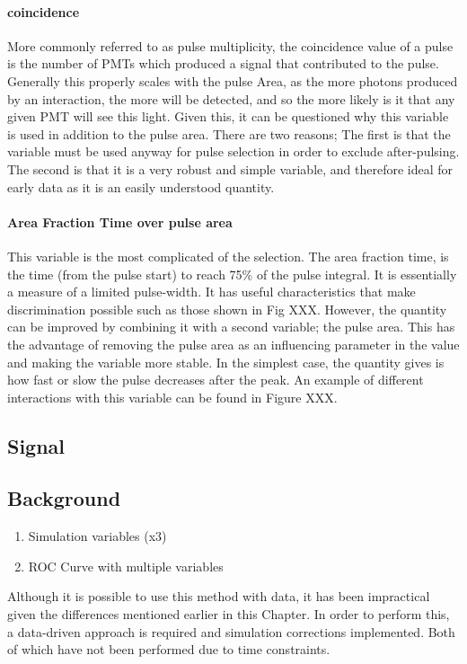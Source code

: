 \paragraph{coincidence}
More commonly referred to as pulse multiplicity, the coincidence value of a pulse is the number of PMTs which produced a signal that contributed to the pulse.
Generally this properly scales with the pulse Area, as the more photons produced by an interaction, the more will be detected, and so the more likely is it that any given PMT will see this light.
Given this, it can be questioned why this variable is used in addition to the pulse area. 
There are two reasons;
The first is that the variable must be used anyway for pulse selection in order to exclude after-pulsing.
The second is that it is a very robust and simple variable, and therefore ideal for early data as it is an easily understood quantity.

\paragraph{Area Fraction Time over pulse area}
This variable is the most complicated of the selection.
The area fraction time, is the time (from the pulse start) to reach 75\% of the pulse integral.
It is essentially a measure of a limited pulse-width.
It has useful characteristics that make discrimination possible such as those shown in Fig XXX.
However, the quantity can be improved by combining it with a second variable; the pulse area.
This has the advantage of removing the pulse area as an influencing parameter in the value and making the variable more stable.
In the simplest case, the quantity gives is how fast or slow the pulse decreases after the peak.
An example of different interactions with this variable can be found in Figure XXX.

\subsection{Signal}

\subsection{Background}


\begin{tcolorbox}[colback=red!5!white, colframe=red!50!black, title=Key Plots]
\begin{enumerate}
    \item Simulation variables (x3)
    \item ROC Curve with multiple variables
\end{enumerate}
\end{tcolorbox}

\par
Although it is possible to use this method with data, it has been impractical given the differences mentioned earlier in this Chapter.
In order to perform this, a data-driven approach is required and simulation corrections implemented.
Both of which have not been performed due to time constraints.
